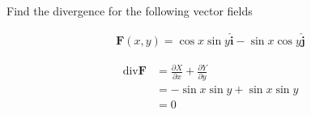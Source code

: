 Find the divergence for the following vector fields

\begin{align*}
    \boldsymbol{F}(x, y) = \cos{x}\sin{y} \boldsymbol{\hat{i}} - \sin{x}\cos{y} \boldsymbol{\hat{j}}
\end{align*}

\begin{solution}
\begin{align*}
    \mathrm{div}\boldsymbol{F} &= \frac{\partial X}{\partial x} + \frac{\partial Y}{\partial y} \\
    &= -\sin{x}\sin{y} + \sin{x}\sin{y} \\
    &= 0
\end{align*}
\end{solution}